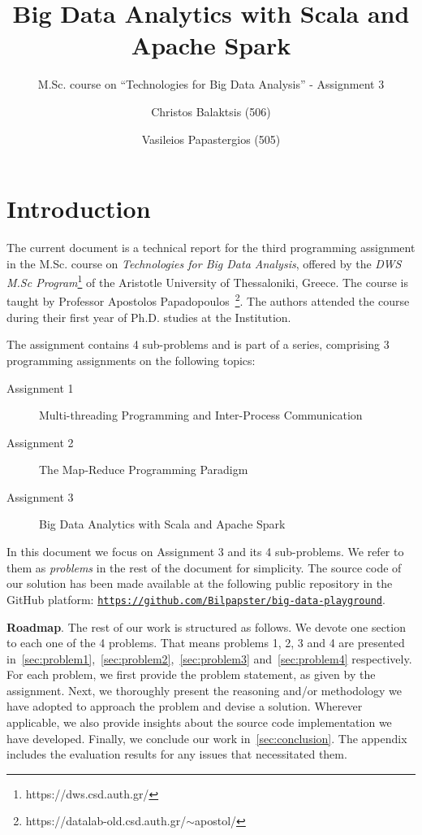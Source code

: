 \documentclass[acmlarge]{acmart}
\begin{document}
\title{Big Data Analytics with Scala and Apache Spark}
\subtitle{M.Sc. course on ``Technologies for Big Data Analysis'' - Assignment 3}

\author{Christos Balaktsis (506)}
\author{Vasileios Papastergios (505)}

\renewcommand{\shortauthors}{C. Balaktsis and V. Papastergios}
\maketitle

\section{Introduction}

The current document is a technical report for the third programming assignment in the M.Sc. course on
\emph{Technologies for Big Data Analysis}, offered by the \emph{DWS M.Sc Program}\footnote{https://dws.csd.auth.gr/} of the Aristotle University of Thessaloniki, Greece. The course is taught by Professor Apostolos Papadopoulos~\footnote{https://datalab-old.csd.auth.gr/$\sim$apostol/}. The authors attended the course during their first year of Ph.D. studies at the Institution.

The assignment contains 4 sub-problems and is part of a series, comprising 3 programming assignments on the following topics:
\begin{description}
  \item[Assignment 1] Multi-threading Programming and Inter-Process Communication
  \item[Assignment 2] The Map-Reduce Programming Paradigm
  \item[Assignment 3] Big Data Analytics with Scala and Apache Spark
\end{description}
In this document we focus on Assignment 3 and its 4 sub-problems.
We refer to them as \emph{problems} in the rest of the document for simplicity.
The source code of our solution has been made available at the following public repository in the GitHub platform: \href{https://github.com/Bilpapster/big-data-playground}{\texttt{\small https://github.com/Bilpapster/big-data-playground}}.

\textbf{Roadmap}.
The rest of our work is structured as follows.
We devote one section to each one of the 4 problems.
That means problems 1, 2, 3 and 4 are presented in~\autoref{sec:problem1},~\autoref{sec:problem2},~\autoref{sec:problem3} and~\autoref{sec:problem4} respectively.
For each problem, we first provide the problem statement, as given by the assignment.
Next, we thoroughly present the reasoning and/or methodology we have adopted to approach the problem and devise a solution.
Wherever applicable, we also provide insights about the source code implementation we have developed.
Finally, we conclude our work in~\autoref{sec:conclusion}.
The appendix includes the evaluation results for any issues that necessitated them.
\end{document}
